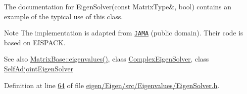 The documentation for Eigen\+Solver(const Matrix\+Type\&, bool) contains an example of the typical use of this class.

\begin{DoxyNote}{Note}
The implementation is adapted from \href{http://math.nist.gov/javanumerics/jama/}{\tt J\+A\+MA} (public domain). Their code is based on E\+I\+S\+P\+A\+CK.
\end{DoxyNote}
\begin{DoxySeeAlso}{See also}
\hyperlink{group___core___module_a30430fa3d5b4e74d312fd4f502ac984d}{Matrix\+Base\+::eigenvalues()}, class \hyperlink{group___eigenvalues___module_class_eigen_1_1_complex_eigen_solver}{Complex\+Eigen\+Solver}, class \hyperlink{group___eigenvalues___module_class_eigen_1_1_self_adjoint_eigen_solver}{Self\+Adjoint\+Eigen\+Solver} 
\end{DoxySeeAlso}


Definition at line \hyperlink{eigen_2_eigen_2src_2_eigenvalues_2_eigen_solver_8h_source_l00064}{64} of file \hyperlink{eigen_2_eigen_2src_2_eigenvalues_2_eigen_solver_8h_source}{eigen/\+Eigen/src/\+Eigenvalues/\+Eigen\+Solver.\+h}.

